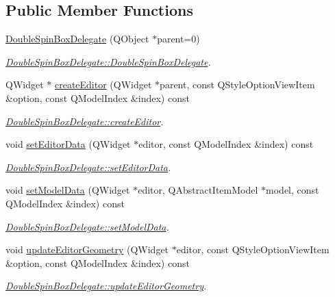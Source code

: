\subsection*{Public Member Functions}
\begin{DoxyCompactItemize}
\item 
\hyperlink{classGui_1_1Widgets_1_1Delegates_1_1DoubleSpinBoxDelegate_a6d7df575ca17247028df99296fd2cf88}{Double\-Spin\-Box\-Delegate} (Q\-Object $\ast$parent=0)
\begin{DoxyCompactList}\small\item\em \hyperlink{classGui_1_1Widgets_1_1Delegates_1_1DoubleSpinBoxDelegate_a6d7df575ca17247028df99296fd2cf88}{Double\-Spin\-Box\-Delegate\-::\-Double\-Spin\-Box\-Delegate}. \end{DoxyCompactList}\item 
Q\-Widget $\ast$ \hyperlink{classGui_1_1Widgets_1_1Delegates_1_1DoubleSpinBoxDelegate_a681be1ef9cc0db4e315bc2cb8f7690be}{create\-Editor} (Q\-Widget $\ast$parent, const Q\-Style\-Option\-View\-Item \&option, const Q\-Model\-Index \&index) const 
\begin{DoxyCompactList}\small\item\em \hyperlink{classGui_1_1Widgets_1_1Delegates_1_1DoubleSpinBoxDelegate_a681be1ef9cc0db4e315bc2cb8f7690be}{Double\-Spin\-Box\-Delegate\-::create\-Editor}. \end{DoxyCompactList}\item 
void \hyperlink{classGui_1_1Widgets_1_1Delegates_1_1DoubleSpinBoxDelegate_a60bb2e12c0b0398c74d0e8c95304d7e4}{set\-Editor\-Data} (Q\-Widget $\ast$editor, const Q\-Model\-Index \&index) const 
\begin{DoxyCompactList}\small\item\em \hyperlink{classGui_1_1Widgets_1_1Delegates_1_1DoubleSpinBoxDelegate_a60bb2e12c0b0398c74d0e8c95304d7e4}{Double\-Spin\-Box\-Delegate\-::set\-Editor\-Data}. \end{DoxyCompactList}\item 
void \hyperlink{classGui_1_1Widgets_1_1Delegates_1_1DoubleSpinBoxDelegate_a9c07f33b62b05f64979f52e9fead2553}{set\-Model\-Data} (Q\-Widget $\ast$editor, Q\-Abstract\-Item\-Model $\ast$model, const Q\-Model\-Index \&index) const 
\begin{DoxyCompactList}\small\item\em \hyperlink{classGui_1_1Widgets_1_1Delegates_1_1DoubleSpinBoxDelegate_a9c07f33b62b05f64979f52e9fead2553}{Double\-Spin\-Box\-Delegate\-::set\-Model\-Data}. \end{DoxyCompactList}\item 
void \hyperlink{classGui_1_1Widgets_1_1Delegates_1_1DoubleSpinBoxDelegate_a6de2edfe709a762d907a47d027fb8ba9}{update\-Editor\-Geometry} (Q\-Widget $\ast$editor, const Q\-Style\-Option\-View\-Item \&option, const Q\-Model\-Index \&index) const 
\begin{DoxyCompactList}\small\item\em \hyperlink{classGui_1_1Widgets_1_1Delegates_1_1DoubleSpinBoxDelegate_a6de2edfe709a762d907a47d027fb8ba9}{Double\-Spin\-Box\-Delegate\-::update\-Editor\-Geometry}. \end{DoxyCompactList}\end{DoxyCompactItemize}


